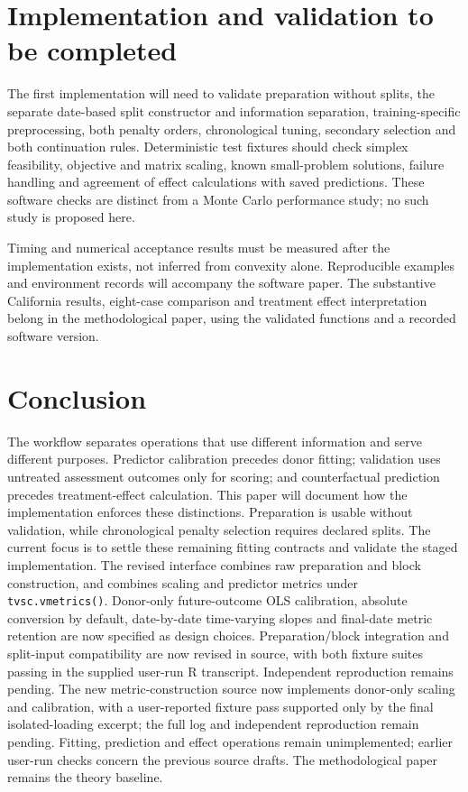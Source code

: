 \documentclass[11pt]{article}
\begin{document}
\section{Implementation and validation to be completed}
The first implementation will need to validate preparation without splits,
the separate date-based split constructor and information separation,
training-specific preprocessing, both penalty orders, chronological tuning,
secondary selection and both continuation rules. Deterministic test
fixtures should check simplex feasibility, objective and matrix scaling,
known small-problem solutions, failure handling and agreement of effect
calculations with saved predictions. These software checks are distinct
from a Monte Carlo performance study; no such study is proposed here.

Timing and numerical acceptance results must be measured after the
implementation exists, not inferred from convexity alone. Reproducible
examples and environment records will accompany the software paper.
The substantive California results, eight-case comparison and treatment
effect interpretation belong in the methodological paper, using the
validated functions and a recorded software version.

\section{Conclusion}
The workflow separates operations that use different information and
serve different purposes. Predictor calibration precedes donor fitting;
validation uses untreated assessment outcomes only for scoring; and
counterfactual prediction precedes treatment-effect calculation. This
paper will document how the implementation enforces these distinctions.
Preparation is usable without validation, while chronological penalty
selection requires declared splits. The current focus is to settle these
remaining fitting contracts and validate the staged implementation. The
revised interface combines raw preparation and block construction, and
combines scaling and predictor metrics under \texttt{tvsc.vmetrics()}.
Donor-only future-outcome OLS calibration, absolute conversion by default,
date-by-date time-varying slopes and final-date metric retention are now
specified as design choices. Preparation/block integration and split-input
compatibility are now revised in source, with both fixture suites passing
in the supplied user-run R transcript. Independent reproduction remains
pending. The new metric-construction source now implements donor-only
scaling and calibration, with a user-reported fixture pass supported only
by the final isolated-loading excerpt; the full log and independent
reproduction remain pending. Fitting,
prediction and effect operations remain unimplemented; earlier user-run
checks concern the previous source drafts. The
methodological paper remains the theory baseline.
\end{document}
